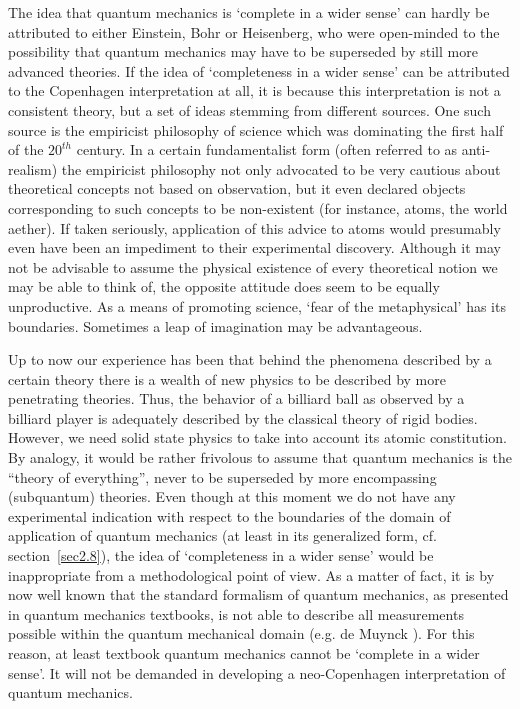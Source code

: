 \documentclass[12pt]{article}
\begin{document}
The idea that quantum mechanics is `complete in a wider sense' can
hardly be attributed to either Einstein, Bohr or Heisenberg, who
were open-minded to the possibility that quantum mechanics may
have to be superseded by still more advanced theories. If the idea
of `completeness in a wider sense' can be attributed to the
Copenhagen interpretation at all, it is because this
interpretation is not a consistent theory, but a set of ideas
stemming from different sources. One such source is the empiricist
philosophy of science which was dominating the first half of the
$20^{th}$ century. In a certain fundamentalist form (often
referred to as anti-realism) the empiricist philosophy not only
advocated to be very cautious about theoretical concepts not based
on observation, but it even declared objects corresponding to such
concepts to be non-existent (for instance, atoms, the world
aether). If taken seriously, application of this advice to atoms
would presumably even have been an impediment to their
experimental discovery. Although it may not be advisable to assume
the physical existence of every theoretical notion we may be able
to think of, the opposite attitude does seem to be equally
unproductive. As a means of promoting science, `fear of the
metaphysical' has its boundaries. Sometimes a leap of imagination
may be advantageous.

Up to now our experience has been that behind the phenomena
described by a certain theory there is a wealth of new physics to
be described by more penetrating theories. Thus, the behavior of a
billiard ball as observed by a billiard player is adequately
described by the classical theory of rigid bodies. However, we
need solid state physics to take into account its atomic
constitution. By analogy, it would be rather frivolous to assume
that quantum mechanics is the ``theory of everything'', never to
be superseded by more encompassing (subquantum) theories. Even
though at this moment we do not have any experimental indication
with respect to the boundaries of the domain of application of
quantum mechanics (at least in its generalized form, cf.
section~\ref{sec2.8}), the idea of `completeness in a wider sense'
would be inappropriate from a methodological point of view. As a
matter of fact, it is by now well known that the standard
formalism of quantum mechanics, as presented in quantum mechanics
textbooks, is not able to describe all measurements possible
within the quantum mechanical domain (e.g. de Muynck
\cite{dM2002}). For this reason, at least textbook quantum
mechanics cannot be `complete in a wider sense'. It will not be
demanded in developing a neo-Copenhagen interpretation of quantum
mechanics.
\end{document}
